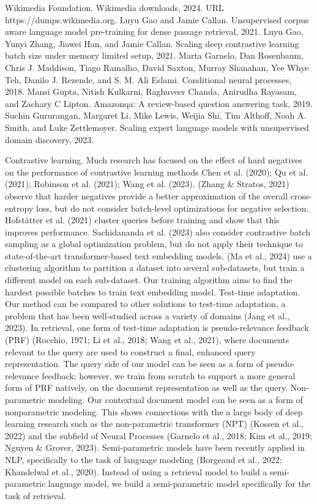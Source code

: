 Wikimedia Foundation. Wikimedia downloads, 2024. URL https://dumps.wikimedia.org.
Luyu Gao and Jamie Callan. Unsupervised corpus aware language model pre-training for dense passage retrieval, 2021.
Luyu Gao, Yunyi Zhang, Jiawei Han, and Jamie Callan. Scaling deep contrastive learning batch size under memory limited setup, 2021.
Marta Garnelo, Dan Rosenbaum, Chris J. Maddison, Tiago Ramalho, David Saxton, Murray Shanahan, Yee Whye Teh, Danilo J. Rezende, and S. M. Ali Eslami. Conditional neural processes, 2018.
Mansi Gupta, Nitish Kulkarni, Raghuveer Chanda, Anirudha Rayasam, and Zachary C Lipton. Amazonqa: A review-based question answering task, 2019.
Suchin Gururangan, Margaret Li, Mike Lewis, Weijia Shi, Tim Althoff, Noah A. Smith, and Luke Zettlemoyer. Scaling expert language models with unsupervised domain discovery, 2023.

Contrastive learning. Much research has focused on the effect of hard negatives on the performance of contrastive learning methods Chen et al. (2020); Qu et al. (2021); Robinson et al. (2021); Wang et al. (2023). (Zhang \& Stratos, 2021) observe that harder negatives provide a better approximation of the overall cross-entropy loss, but do not consider batch-level optimizations for negative selection. Hofstätter et al. (2021) cluster queries before training and show that this improves performance. Sachidananda et al. (2023) also consider contrastive batch sampling as a global optimization problem, but do not apply their technique to state-of-the-art transformer-based text embedding models. (Ma et al., 2024) use a clustering algorithm to partition a dataset into several sub-datasets, but train a different model on each sub-dataset. Our training algorithm aims to find the hardest possible batches to train text embedding model.
Test-time adaptation. Our method can be compared to other solutions to test-time adaptation, a problem that has been well-studied across a variety of domains (Jang et al., 2023). In retrieval, one form of test-time adaptation is pseudo-relevance feedback (PRF) (Rocchio, 1971; Li et al., 2018; Wang et al., 2021), where documents relevant to the query are used to construct a final, enhanced query representation. The query side of our model can be seen as a form of pseudo-relevance feedback; however, we train from scratch to support a more general form of PRF natively, on the document representation as well as the query.
Non-parametric modeling. Our contextual document model can be seen as a form of nonparametric modeling. This shows connections with the a large body of deep learning research such as the non-parametric transformer (NPT) (Kossen et al., 2022) and the subfield of Neural Processes (Garnelo et al., 2018; Kim et al., 2019; Nguyen \& Grover, 2023). Semi-parametric models have been recently applied in NLP, specifically to the task of language modeling (Borgeaud et al., 2022; Khandelwal et al., 2020). Instead of using a retrieval model to build a semi-parametric language model, we build a semi-parametric model specifically for the task of retrieval.

